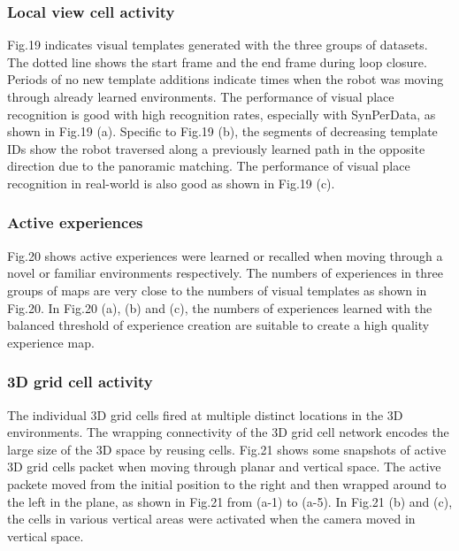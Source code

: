 \subsubsection{Local view cell activity}

Fig.19 indicates visual templates generated with the three groups of datasets.
The dotted line shows the start frame and the end frame during loop closure.
Periods of no new template additions indicate times when the robot was moving through already learned environments.
The performance of visual place recognition is good with high recognition rates, especially with SynPerData, as shown in Fig.19 (a).
Specific to Fig.19 (b), the segments of decreasing template IDs show the robot traversed along a previously learned path in the opposite direction due to the panoramic matching.
The performance of visual place recognition in real-world is also good as shown in Fig.19 (c).


\subsubsection{Active experiences}
Fig.20 shows active experiences were learned or recalled when moving through a novel or familiar environments respectively.
The numbers of experiences in three groups of maps are very close to the numbers of visual templates as shown in Fig.20.
In Fig.20 (a), (b) and (c), the numbers of experiences learned with the balanced threshold of experience creation are suitable to create a high quality experience map.



\subsubsection{3D grid cell activity}

The individual 3D grid cells fired at multiple distinct locations in the 3D environments.
The wrapping connectivity of the 3D grid cell network encodes the large size of the 3D space by reusing cells.
Fig.21 shows some snapshots of active 3D grid cells packet when moving through planar and vertical space.
The active packete moved from the initial position to the right and then wrapped around to the left in the plane, as shown in Fig.21 from (a-1) to (a-5).
In Fig.21 (b) and (c), the cells in various vertical areas were activated when the camera moved in vertical space.


